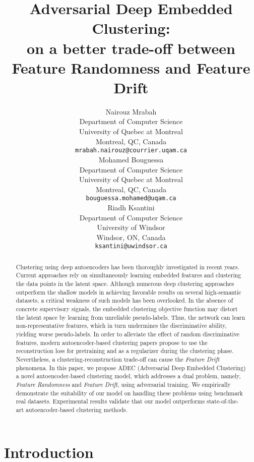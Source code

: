 \documentclass{article}
\title{Adversarial Deep Embedded Clustering:\\on a better trade-off between\\Feature Randomness and Feature Drift}
\author{
  Nairouz Mrabah\\
  Department of Computer Science\\
  University of Quebec at Montreal\\
  Montreal, QC, Canada\\
  \texttt{mrabah.nairouz@courrier.uqam.ca} \\
\And
  Mohamed Bouguessa\\
  Department of Computer Science\\
  University of Quebec at Montreal\\
  Montreal, QC, Canada\\
  \texttt{bouguessa.mohamed@uqam.ca} \\
   \And
  Riadh Ksantini\\
  Department of Computer Science\\
  University of Windsor\\
  Windsor, ON, Canada\\
  \texttt{ksantini@uwindsor.ca} \\
}
\begin{document}
\maketitle

\begin{abstract}
Clustering using deep autoencoders has been thoroughly investigated in recent years. Current approaches rely on simultaneously learning embedded features and clustering the data points in the latent space. Although numerous deep clustering approaches outperform the shallow models in achieving favorable results on several high-semantic datasets, a critical weakness of such models has been overlooked. In the absence of concrete supervisory signals, the embedded clustering objective function may distort the latent space by learning from unreliable pseudo-labels. Thus, the network can learn non-representative features, which in turn undermines the discriminative ability, yielding worse pseudo-labels. In order to alleviate the effect of random discriminative features, modern autoencoder-based clustering papers propose to use the reconstruction loss for pretraining and as a regularizer during the clustering phase. Nevertheless, a clustering-reconstruction trade-off can cause the \textit{Feature Drift} phenomena. In this paper, we propose ADEC (Adversarial Deep Embedded Clustering) a novel autoencoder-based clustering model, which addresses a dual problem, namely, \textit{Feature Randomness} and \textit{Feature Drift}, using adversarial training. We empirically demonstrate the suitability of our model on handling these problems using benchmark real datasets. Experimental results validate that our model outperforms state-of-the-art autoencoder-based clustering methods.
\end{abstract}




\section{Introduction} \label{S:1}
\end{document}
